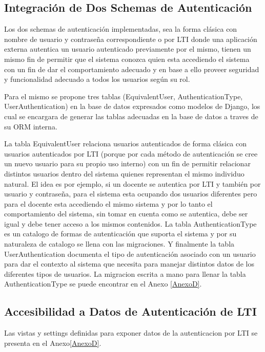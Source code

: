 \subsection{Integración de Dos Schemas de Autenticación}
Los dos schemas de autenticación implementadas, sea la forma clásica con nombre de usuario y contraseña correspondiente o por LTI  donde una aplicación externa autentica un usuario autenticado previamente por el mismo, tienen un mismo fin de permitir que el sistema conozca quien esta accediendo el sistema con un fin de dar el comportamiento adecuado y en base a ello proveer seguridad y funcionalidad adecuado a todos los usuarios según su rol.

Para el mismo se propone tres tablas (EquivalentUser, AuthenticationType, UserAuthentication) en la base de datos expresados como modelos de Django, los cual se encargara de generar las tablas adecuadas en la base de datos a traves de su ORM interna.

La tabla EquivalentUser relaciona usuarios autenticados de forma clásica con usuarios autenticados por LTI  (porque por cada método de autenticación se cree un nuevo usuario para su propio uso interno) con un fin de permitir relacionar distintos usuarios dentro del sistema quienes representan el mismo individuo natural. El idea es por ejemplo, si un docente se autentica por LTI  y también por usuario y contraseña, para el sistema esta ocupando dos usuarios diferentes pero para el docente esta accediendo el mismo sistema y por lo tanto el comportamiento del sistema, sin tomar en cuenta como se autentica, debe ser igual y debe tener acceso a los mismos contenidos. La tabla AuthenticationType es un catalogo de formas de autenticación que suporta el sistema y por su naturaleza de catalogo se llena con las migraciones. Y finalmente la tabla UserAuthentication documenta el tipo de autenticación asociado con un usuario para dar el contexto al sistema que necesita para manejar distintos datos de los diferentes tipos de usuarios. La migracion escrita a mano para llenar la tabla AuthenticationType se puede encontrar en el Anexo \ref{AnexoD}.

\subsection{Accesibilidad a Datos de Autenticación de LTI}
Las vistas y settings definidas para exponer datos de la autenticacion por LTI se presenta en el Anexo\ref{AnexoD}.

